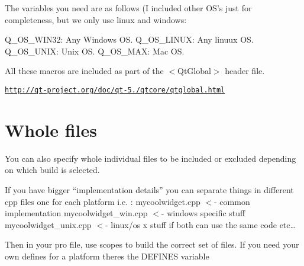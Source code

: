 The variables you need are as follows (I included other O\-S's just for completeness, but we only use linux and windows\-:


\begin{DoxyEnumerate}
\item Q\-\_\-\-O\-S\-\_\-\-W\-I\-N32\-: Any Windows O\-S. Q\-\_\-\-O\-S\-\_\-\-L\-I\-N\-U\-X\-: Any linuux O\-S. Q\-\_\-\-O\-S\-\_\-\-U\-N\-I\-X\-: Unix O\-S. Q\-\_\-\-O\-S\-\_\-\-M\-A\-X\-: Mac O\-S.
\end{DoxyEnumerate}

All these macros are included as part of the $<$\-Qt\-Global$>$ header file.

\href{http://qt-project.org/doc/qt-5.0/qtcore/qtglobal.html}{\tt http\-://qt-\/project.\-org/doc/qt-\/5./qtcore/qtglobal.\-html}

\section*{Whole files}

You can also specify whole individual files to be included or excluded depending on which build is selected.

If you have bigger “implementation details” you can separate things in different cpp files one for each platform i.\-e. \-: mycoolwidget.\-cpp $<$-\/ common implementation mycoolwidget\-\_\-win.\-cpp $<$-\/ windows specific stuff mycoolwidget\-\_\-unix.\-cpp $<$-\/ linux/os x stuff if both can use the same code etc…

Then in your pro file, use scopes to build the correct set of files. If you need your own defines for a platform theres the D\-E\-F\-I\-N\-E\-S variable 